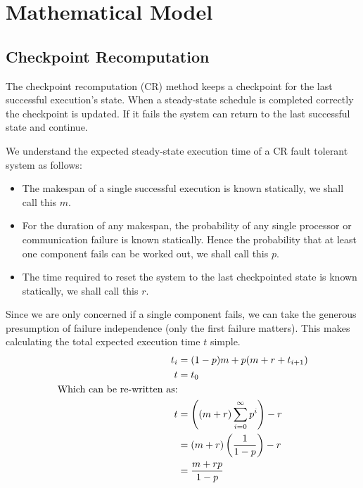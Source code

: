 \chapter{Mathematical Model}

\section{Checkpoint Recomputation}
The checkpoint recomputation (CR) method keeps a checkpoint for the last successful execution's state.
When a steady-state schedule is completed correctly the checkpoint is updated.
If it fails the system can return to the last successful state and continue.

We understand the expected steady-state execution time of a CR fault tolerant system as follows:
\begin{itemize}
	\item The makespan of a single successful execution is known statically, we shall call this $m$.
	\item For the duration of any makespan, the probability of any single processor or communication failure is known statically.
			Hence the probability that at least one component fails can be worked out, we shall call this $p$.
	\item The time required to reset the system to the last checkpointed state is known statically, we shall call this $r$.
\end{itemize}

Since we are only concerned if a single component fails, we can take the generous presumption of failure independence (only the first failure matters).
This makes calculating the total expected execution time $t$ simple.
\begin{align}
	\nonumber t_i & = (1-p)m + p(m + r + t_{i+1}) \\
	\nonumber t & = t_0 \\
	\nonumber \mbox{Which can be re-written as:}& \\
	\nonumber t & = \left({(m+r)\displaystyle\sum\limits_{i=0}^\infty p^i }\right) - r \\
	\nonumber & = (m+r)\left({{1}\over{1-p}}\right) - r\\
	\nonumber & = {{m+rp}\over{1-p}}
\end{align}